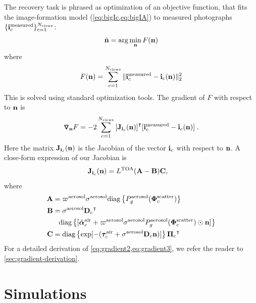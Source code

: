 \documentclass[10pt,letterpaper]{article}
\newcommand{\OpDiag}[1]{\mathrm{diag}\left\{#1\right\}}
\newcommand{\Grad}[1]{\bm{\triangledown_{#1}}}
\newcommand{\argmin}{\mathrm{arg}\min}
\newcommand{\vect}[1]{\bm{#1}}
\newcommand{\transpose}[1]{{#1}^\intercal}
\begin{document}
The recovery task is phrased as optimization of an objective function,
that fits the image-formation model (\cref{eq:bigIc,eq:bigIA}) to
measured photographs $\{ {\bf i}^{\rm measured}_c\}_{c=1}^{N_{\rm
    views}}$:
\begin{equation}
  \label{eq:minobjectiveA}
  \hat{\bf n} =
  \argmin_{{\bf n}} F({\bf n})
\end{equation}
where
\begin{equation}
  \label{eq:objectiveA}
  F({\bf n})
  = \sum_{c=1}^{N_{\rm views}}
  \| {\bf i}^{\rm measured}_c - {\bf i}_c({\bf n})\|^2_2
\end{equation}
This is solved using standard optimization tools.  The gradient of $F$
with respect to ${\bf n}$ is
\begin{align}
  \Grad{{\bf n}} F = -2\sum_{c=1}^{N_{\rm views}}
  \transpose{\left[{\bf J}_{{\bf i}_c}({\bf n})\right]} [{\bf i}^{\rm
    measured}_c - {\bf i}_c({\bf n})] \;.
  \label{eq:gradient1}
\end{align}
Here the matrix ${\bf J}_{{\bf i}_c}({\bf n})$ is the Jacobian of the
vector ${\bf i}_c$ with respect to ${\bf n}$. A close-form expression
of our Jacobian is
\begin{align}
  {\bf J}_{{\bf i}_c}({\bf n}) &= L^{\rm TOA}({\bf A}-{\bf B}){\bf C}
  ,
  \label{eq:gradient2}
\end{align}
where
\begin{align}
  \label{eq:gradient3}
  {\bf A} &= \varpi^{\rm aerosol}\sigma^{\rm aerosol}
  \OpDiag{ P_g^{\rm aerosol}(\vect{\Phi}^{\rm scatter}_c)} \nonumber\\
  {\bf B} &= {\sigma}^{\rm aerosol}\transpose{{\bf D}_c} \nonumber\\
  & \;\;\; \OpDiag{[\tilde{\vect{\alpha}}^{\rm air}_c + \varpi^{\rm
      aerosol}\sigma^{\rm aerosol} P^{\rm aerosol}_g(\vect{\Phi}^{\rm
      scatter}_c) \odot{\bf n}
    ]} \nonumber \\
  {\bf C} &= \OpDiag{\exp[-(\vect{\tau}_c^{\rm air} + {\sigma}^{\rm
      aerosol} {\bf D}_c {\bf n})]} \transpose{{\vect{\Pi}}_c}
\end{align}
For a detailed derivation of \cref{eq:gradient2,eq:gradient3}, we
refer the reader to \cref{sec:gradient-derivation}.


\section{Simulations}
\label{sec:simul}
\end{document}
